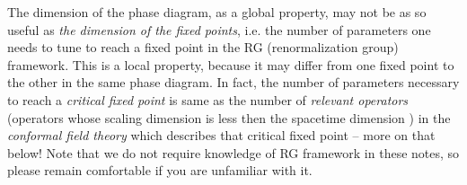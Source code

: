\documentclass[12pt]{article}
\numberwithin{equation}{section}
\begin{document}
The dimension of the phase diagram, as a global property, may not be as so useful as \emph{the dimension of the fixed points}, i.e. the number of parameters one needs to tune to reach a fixed point in the RG (renormalization group) framework. This is a local property, because it may differ from one fixed point to the other in the same phase diagram. In fact, the number of parameters necessary to reach a \emph{critical fixed point} is same as the number of \emph{relevant operators} (operators whose scaling dimension is less then the spacetime dimension \label{page: first instance of relevant operators}) in the \emph{conformal field theory} which describes that critical fixed point -- more on that below! Note that we do not require knowledge of RG framework in these notes, so please remain comfortable if you are unfamiliar with it. 
\end{document}
